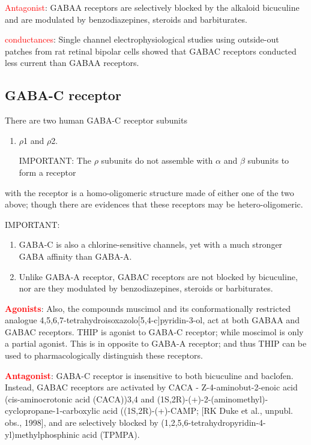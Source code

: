 \textcolor{red}{Antagonist}: GABAA receptors are selectively blocked by the
alkaloid bicuculine and are modulated by benzodiazepines, steroids and
barbiturates.

\textcolor{red}{conductances}: Single channel electrophysiological studies using
outside-out patches from rat retinal bipolar cells showed that GABAC receptors
conducted less current than GABAA receptors.

\subsection{GABA-C receptor}
\label{sec:GABAC-receptor}

There are two human GABA-C receptor subunits
\begin{enumerate}
  \item  $\rho$1 and $\rho$2.

IMPORTANT: The $\rho$ subunits do not assemble with $\alpha$ and $\beta$
subunits to form a receptor

\end{enumerate}
with the receptor is a homo-oligomeric structure made of either one of the two
above; though there are evidences that these receptors may be hetero-oligomeric.


IMPORTANT:
\begin{enumerate}
  \item  GABA-C is also a chlorine-sensitive channels, yet with a much stronger
  GABA affinity than GABA-A.

  \item Unlike GABA-A receptor, GABAC receptors are not blocked by bicuculine, nor are
they modulated by benzodiazepines, steroids or barbiturates.
\end{enumerate}


\textcolor{red}{\bf Agonists}: Also, the compounds muscimol and its
conformationally restricted analogue 4,5,6,7-tetrahydroisoxazolo[5,4-c]pyridin-3-ol, act at both
GABAA and GABAC receptors.
THIP is agonist to GABA-C receptor; while moscimol is only a partial agonist.
This is in opposite to GABA-A receptor; and thus  THIP can be
used to pharmacologically distinguish these receptors.


\textcolor{red}{\bf Antagonist}: 
GABA-C receptor is insensitive to both bicuculine and baclofen.
Instead, GABAC receptors are activated by CACA -
Z-4-aminobut-2-enoic acid (cis-aminocrotonic acid (CACA))3,4 and 
(1S,2R)-(+)-2-(aminomethyl)-cyclopropane-1-carboxylic acid ((1S,2R)-(+)-CAMP; 
[RK Duke et al., unpubl. obs., 1998], and are selectively blocked
by (1,2,5,6-tetrahydropyridin-4-yl)methylphosphinic acid (TPMPA).


